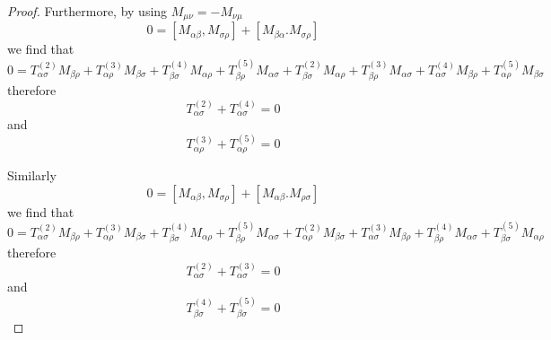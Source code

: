 \begin{proof}
        Furthermore, by using $M_{\mu\nu} = - M_{\nu\mu}$
        \begin{equation*}
            0 = [M_{\alpha\beta}, M_{\sigma \rho}] + [M_{\beta\alpha}. M_{\sigma\rho}]
        \end{equation*}
        we find that 
        \begin{equation*}
            0 = T^{(2)}_{\alpha\sigma} M_{\beta\rho} + T^{(3)}_{\alpha\rho} M_{\beta\sigma} + T^{(4)}_{\beta\sigma} M_{\alpha\rho} + T^{(5)}_{\beta\rho} M_{\alpha\sigma } + T^{(2)}_{\beta\sigma} M_{\alpha\rho} + T^{(3)}_{\beta\rho} M_{\alpha\sigma} + T^{(4)}_{\alpha\sigma} M_{\beta\rho} + T^{(5)}_{\alpha\rho} M_{\beta\sigma } 
        \end{equation*}
        therefore
        \begin{equation*}
            T^{(2)}_{\alpha\sigma} + T^{(4)}_{\alpha\sigma} = 0
        \end{equation*}
        and 
        \begin{equation*}
            T^{(3)}_{\alpha\rho} + T^{(5)}_{\alpha\rho} = 0
        \end{equation*}

        Similarly
        \begin{equation*}
            0 = [M_{\alpha\beta}, M_{\sigma \rho}] + [M_{\alpha\beta}. M_{\rho\sigma}]
        \end{equation*}
        we find that 
        \begin{equation*}
            0 = T^{(2)}_{\alpha\sigma} M_{\beta\rho} + T^{(3)}_{\alpha\rho} M_{\beta\sigma} + T^{(4)}_{\beta\sigma} M_{\alpha\rho} + T^{(5)}_{\beta\rho} M_{\alpha\sigma } + T^{(2)}_{\alpha\rho} M_{\beta\sigma} + T^{(3)}_{\alpha\sigma} M_{\beta\rho} + T^{(4)}_{\beta\rho} M_{\alpha\sigma} + T^{(5)}_{\beta\sigma} M_{\alpha\rho }
        \end{equation*}
        therefore
        \begin{equation*}
            T^{(2)}_{\alpha\sigma} + T^{(3)}_{\alpha\sigma} = 0
        \end{equation*}
        and 
        \begin{equation*}
            T^{(4)}_{\beta\sigma} + T^{(5)}_{\beta\sigma} = 0
        \end{equation*}


\end{proof}
